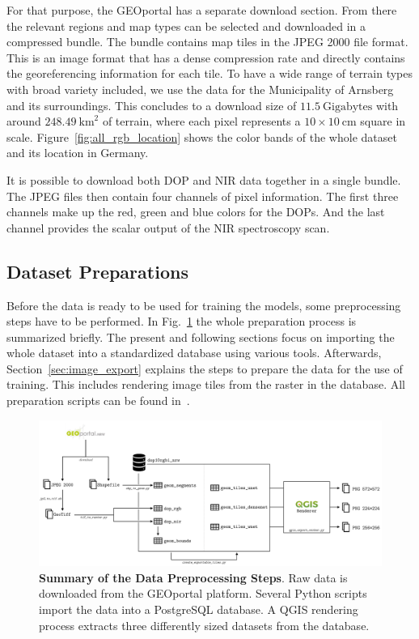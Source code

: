 For that purpose, the GEOportal has a separate download section. From there the relevant regions and map types can be selected and downloaded in a compressed bundle. The bundle contains map tiles in the JPEG 2000 file format. This is an image format that has a dense compression rate and directly contains the georeferencing information for each tile. To have a wide range of terrain types with broad variety included, we use the data for the Municipality of Arnsberg and its surroundings. This concludes to a download size of $11.5~\text{Gigabytes}$ with around $248.49~\text{km}^2$ of terrain, where each pixel represents a $10\times 10~\text{cm}$ square in scale. Figure~\ref{fig:all_rgb_location} shows the color bands of the whole dataset and its location in Germany.

It is possible to download both DOP and NIR data together in a single bundle. The JPEG files then contain four channels of pixel information. The first three channels make up the red, green and blue colors for the DOPs. And the last channel provides the scalar output of the NIR spectroscopy scan.

\subsection{Dataset Preparations}
Before the data is ready to be used for training the models, some preprocessing steps have to be performed. In Fig.~\ref{fig:data_preprocessing} the whole preparation process is summarized briefly. The present and following sections focus on importing the whole dataset into a standardized database using various tools. Afterwards, Section~\ref{sec:image_export} explains the steps to prepare the data for the use of training. This includes rendering image tiles from the raster in the database. All preparation scripts can be found in~\cite{thesis-code20}.

\begin{figure}[h]
    \centering
    \includegraphics[width=\textwidth]{images/data_preprocessing}
    \caption[Summary of the Data Preprocessing Steps]
    {\textbf{Summary of the Data Preprocessing Steps}. Raw data is downloaded from the GEOportal platform. Several Python scripts import the data into a PostgreSQL database. A QGIS rendering process extracts three differently sized datasets from the database.}
    \label{fig:data_preprocessing}
\end{figure}

